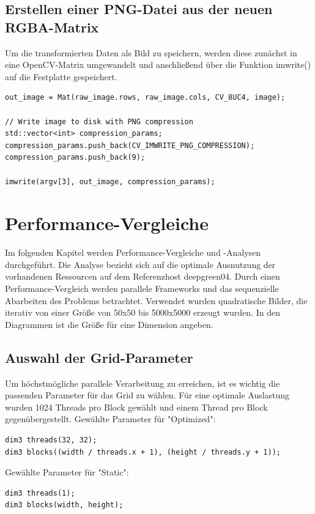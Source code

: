 \documentclass{llncs}
\begin{document}
\newpage

%
\subsection{Erstellen einer PNG-Datei aus der neuen RGBA-Matrix}
%
Um die transformierten Daten als Bild zu speichern, werden diese zunächst in eine OpenCV-Matrix umgewandelt und anschließend über die Funktion imwrite() auf die Festplatte gespeichert.

\begin{lstlisting}
out_image = Mat(raw_image.rows, raw_image.cols, CV_8UC4, image);

// Write image to disk with PNG compression
std::vector<int> compression_params;
compression_params.push_back(CV_IMWRITE_PNG_COMPRESSION);
compression_params.push_back(9);

imwrite(argv[3], out_image, compression_params);
\end{lstlisting}


%
\section{Performance-Vergleiche}
%

Im folgenden Kapitel werden Performance-Vergleiche und -Analysen durchgeführt. Die Analyse bezieht sich auf die optimale Ausnutzung der vorhandenen Ressourcen auf dem Referenzhost deepgreen04. Durch einen Performance-Vergleich werden parallele Frameworks und das sequenzielle Abarbeiten des Problems betrachtet.  Verwendet wurden quadratische Bilder, die iterativ von einer Größe von 50x50 bis 5000x5000 erzeugt wurden. In den Diagrammen ist die Größe für eine Dimension angeben.

%
\subsection{Auswahl der Grid-Parameter}
%

Um höchstmögliche parallele Verarbeitung zu erreichen, ist es wichtig die passenden Parameter für das Grid zu wählen. Für eine optimale Auslastung wurden 1024 Threads pro Block gewählt und einem Thread pro Block gegenübergestellt.
Gewählte Parameter für "Optimized":
\begin{lstlisting}
dim3 threads(32, 32);
dim3 blocks((width / threads.x + 1), (height / threads.y + 1));
\end{lstlisting}

Gewählte Parameter für "Static":
\begin{lstlisting}
dim3 threads(1);
dim3 blocks(width, height);
\end{lstlisting}
\end{document}

